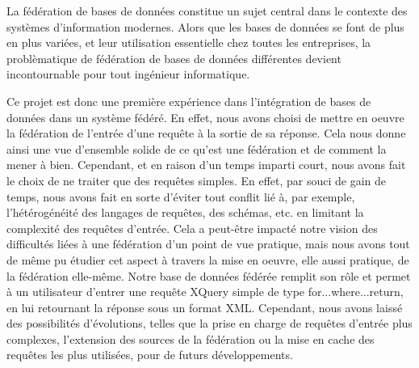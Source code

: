 La fédération de bases de données constitue un sujet central dans le contexte des systèmes d’information modernes. Alors que les bases de données se font de plus en plus variées, et leur utilisation essentielle chez toutes les entreprises, la problèmatique de fédération de bases de données différentes devient incontournable pour tout ingénieur informatique.

Ce projet est donc une première expérience dans l’intégration de bases de données dans un système fédéré. En effet, nous avons choisi de mettre en oeuvre la fédération de l’entrée d’une requête à la sortie de sa réponse. Cela nous donne ainsi une vue d’ensemble solide de ce qu’est une  fédération et de comment la mener à bien. Cependant, et en raison d’un temps imparti court, nous avons fait le choix de ne traiter que des requêtes simples. En effet, par souci de gain de temps, nous avons fait en sorte d’éviter tout conflit lié à, par exemple, l’hétérogénéité des langages de requêtes, des schémas, etc. en limitant la complexité des requêtes d’entrée.  Cela a peut-être impacté notre vision des difficultés liées à une fédération d’un point de vue pratique, mais nous avons tout de même pu étudier cet aspect à travers la mise en oeuvre, elle aussi pratique, de la fédération elle-même. 
Notre base de données fédérée remplit son rôle et permet à un utilisateur d’entrer une requête XQuery simple de type for...where...return, en lui retournant la réponse sous un format XML. Cependant, nous avons laissé des possibilités d’évolutions, telles que la prise en charge de requêtes d’entrée plus complexes, l’extension des sources de la fédération ou la mise en cache des requêtes les plus utilisées, pour de futurs développements.